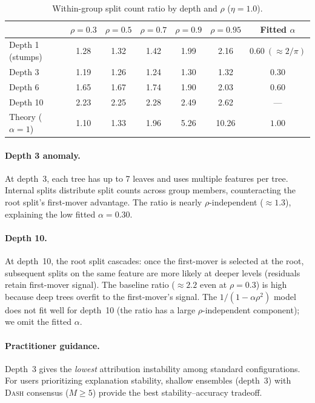 \documentclass{article}
\newcommand{\DASH}{\textsc{Dash}}
\begin{document}
\begin{table}[t]
\centering
\caption{Within-group split count ratio by depth and $\rho$ ($\eta{=}1.0$).}
\label{tab:depth-rho}
\small
\begin{tabular}{@{}lcccccc@{}}
\toprule
 & $\rho{=}0.3$ & $\rho{=}0.5$ & $\rho{=}0.7$ & $\rho{=}0.9$ & $\rho{=}0.95$ & Fitted $\alpha$ \\
\midrule
Depth 1 (stumps) & 1.28 & 1.32 & 1.42 & 1.99 & 2.16 & $0.60\ (\approx 2/\pi)$ \\
Depth 3          & 1.19 & 1.26 & 1.24 & 1.30 & 1.32 & $0.30$ \\
Depth 6          & 1.65 & 1.67 & 1.74 & 1.90 & 2.03 & $0.60$ \\
Depth 10         & 2.23 & 2.25 & 2.28 & 2.49 & 2.62 & --- \\
\midrule
Theory ($\alpha{=}1$) & 1.10 & 1.33 & 1.96 & 5.26 & 10.26 & $1.00$ \\
\bottomrule
\end{tabular}
\end{table}

\paragraph{Depth 3 anomaly.}
At depth~3, each tree has up to 7 leaves and uses multiple features per
tree. Internal splits distribute split counts across group members,
counteracting the root split's first-mover advantage.
The ratio is nearly $\rho$-independent (${\approx}1.3$), explaining the
low fitted $\alpha = 0.30$.

\paragraph{Depth 10.}
At depth~10, the root split cascades: once the first-mover is selected
at the root, subsequent splits on the same feature are more likely at
deeper levels (residuals retain first-mover signal). The baseline ratio
(${\approx}2.2$ even at $\rho{=}0.3$) is high because deep trees
overfit to the first-mover's signal.
The $1/(1{-}\alpha\rho^2)$ model does not fit well for depth~10 (the
ratio has a large $\rho$-independent component); we omit the fitted $\alpha$.

\paragraph{Practitioner guidance.}
Depth~3 gives the \emph{lowest} attribution instability among standard
configurations. For users prioritizing explanation stability, shallow
ensembles (depth~3) with \DASH{} consensus ($M \geq 5$) provide the
best stability--accuracy tradeoff.
\end{document}
